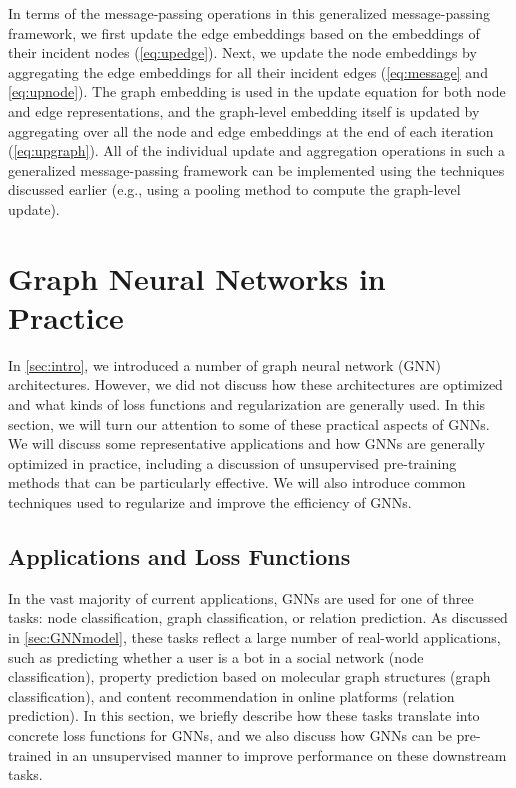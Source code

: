 \documentclass[10pt]{book}
\begin{document}
In terms of the message-passing operations in this generalized message-passing framework, we first update the edge embeddings based on the embeddings of their incident nodes (\autoref{eq:upedge}). Next, we update the node embeddings by aggregating the edge embeddings for all their incident edges (\autoref{eq:message} and \ref{eq:upnode}). The graph embedding is used in the update equation for both node and edge representations, and the graph-level embedding itself is updated by aggregating over all the node and edge embeddings at the end of each iteration (\autoref{eq:upgraph}). All of the individual update and aggregation operations in such a generalized message-passing framework can be implemented using the
techniques discussed earlier (e.g., using a pooling method to compute the graph-level update).


\section{Graph Neural Networks in Practice}

In \autoref{sec:intro}, we introduced a number of graph neural network (GNN) architectures. However, we did not discuss how these architectures are optimized and what kinds of loss functions and regularization are generally used. In this section, we will turn our attention to some of these practical aspects of GNNs. We will discuss some representative applications and how GNNs are generally optimized in practice, including a discussion of unsupervised pre-training methods that can be particularly effective. We will also introduce common techniques used to regularize and improve the efficiency of GNNs.

\subsection{Applications and Loss Functions}

In the vast majority of current applications, GNNs are used for one of three tasks: node classification, graph classification, or relation prediction. As discussed in \autoref{sec:GNNmodel}, these tasks reflect a large number of real-world applications, such as predicting whether a user is a bot in a social network (node classification), property prediction based on molecular graph structures (graph classification), and content recommendation in online platforms (relation prediction). In this section, we briefly describe how these tasks translate into concrete loss functions for GNNs, and we also discuss how GNNs can be pre-trained in an unsupervised manner to improve performance on these downstream tasks.
\end{document}
